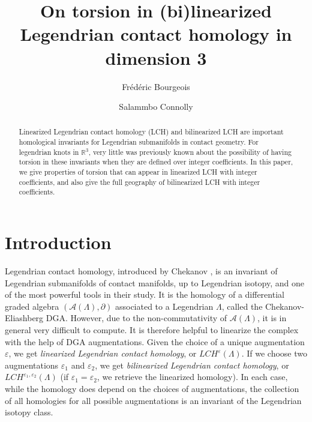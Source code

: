 \documentclass[11pt]{amsart}
\theoremstyle{plain}
\theoremstyle{remark}
\numberwithin{equation}{section}
\newcommand{\R}{\ensuremath{\mathbb{R}}}
\begin{document}
\title[On torsion in (bi)linearized LCH in dim 3]{On torsion in (bi)linearized Legendrian contact homology in dimension 3}
\author[F. Bourgeois]{Fr\'ed\'eric Bourgeois} \address{Universit\'e Paris-Saclay, CNRS, Laboratoire de Math\'ematiques d'Orsay, 
91405 Orsay, France}  
\author[S. Connolly]{Salammbo Connolly} \address{Universit\'e Paris-Saclay, CNRS, Laboratoire de Math\'ematiques d'Orsay, 
91405 Orsay, France}


\begin{abstract}
Linearized Legendrian contact homology (LCH) and bilinearized LCH are important homological invariants for Legendrian submanifolds in contact geometry. 
For legendrian knots in $\R^3$, very little was previously known about the possibility of having torsion in these invariants when they are defined over integer coefficients. In this paper, we give properties of torsion that can appear in linearized LCH with integer coefficients, and also give the full geography of bilinearized LCH with integer coefficients.
\end{abstract} 

\maketitle


\section{Introduction}
\label{sec:introduction}
Legendrian contact homology, introduced by Chekanov \cite{C}, is an invariant of Legendrian submanifolds of contact manifolds, up to Legendrian isotopy, and one of the most powerful tools in their study. It is the homology of a differential graded algebra $(\mathcal{A}(\Lambda),\partial)$ associated to a Legendrian $\Lambda$, called the Chekanov-Eliashberg DGA. However, due to the non-commutativity of $\mathcal{A}(\Lambda)$, it is in general very difficult to compute. It is therefore helpful to linearize the complex with the help of DGA augmentations. Given the choice of a unique augmentation $\varepsilon$, we get \textit{linearized Legendrian contact homology}, or $LCH^\varepsilon(\Lambda)$. If we choose two augmentations $\varepsilon_1$ and $\varepsilon_2$, we get \textit{bilinearized Legendrian contact homology}, or $LCH^{\varepsilon_1,\varepsilon_2}(\Lambda)$ (if $\varepsilon_1=\varepsilon_2$, we retrieve the linearized homology). In each case, while the homology does depend on the choices of augmentations, the collection of all homologies for all possible augmentations is an invariant of the Legendrian isotopy class.
\end{document}
